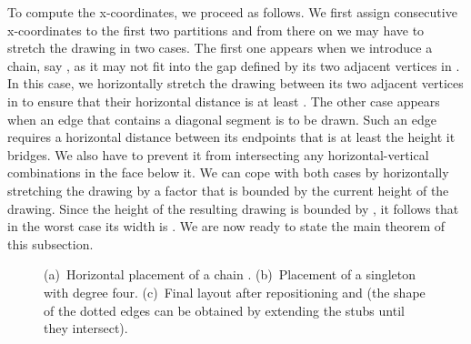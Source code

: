 \documentclass[a4paper,twoside,11pt]{article}
\begin{document}
To compute the x-coordinates, we proceed as follows. We first assign
consecutive x-coordinates to the first two partitions and from there
on we may have to stretch the drawing in two cases. The first one
appears when we introduce a chain, say , as it may not fit into
the gap defined by its two adjacent vertices in . In this
case, we horizontally stretch the drawing between its two adjacent
vertices in  to ensure that their horizontal distance is at
least . The other case appears when an edge that
contains a diagonal segment is to be drawn. Such an edge requires a
horizontal distance between its endpoints that is at least the
height it bridges. We also have to prevent it from intersecting any
horizontal-vertical combinations in the face below it. We can cope
with both cases by horizontally stretching the drawing by a factor
that is bounded by the current height of the drawing. Since the
height of the resulting drawing is bounded by , it
follows that in the worst case its width is . We are now
ready to state the main theorem of this subsection.

\begin{figure}[t]
    \centering
    \begin{minipage}[b]{.32\textwidth}
        \centering
    \end{minipage}
    \begin{minipage}[b]{.32\textwidth}
        \centering
    \end{minipage}
    \begin{minipage}[b]{.32\textwidth}
        \centering
    \end{minipage}
    \caption{
    (a)~Horizontal placement of a chain .
    (b)~Placement of a singleton  with degree four.
    (c)~Final layout after repositioning  and  (the shape of the dotted edges can be obtained by extending the stubs until they intersect).}
    \label{fig:4p_canonical}
\end{figure}
\end{document}
